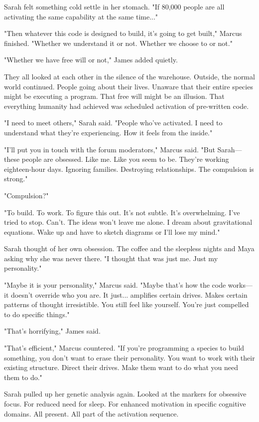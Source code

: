 Sarah felt something cold settle in her stomach. "If 80,000 people are all activating the same capability at the same time..."

"Then whatever this code is designed to build, it's going to get built," Marcus finished. "Whether we understand it or not. Whether we choose to or not."

"Whether we have free will or not," James added quietly.

They all looked at each other in the silence of the warehouse. Outside, the normal world continued. People going about their lives. Unaware that their entire species might be executing a program. That free will might be an illusion. That everything humanity had achieved was scheduled activation of pre-written code.

"I need to meet others," Sarah said. "People who've activated. I need to understand what they're experiencing. How it feels from the inside."

"I'll put you in touch with the forum moderators," Marcus said. "But Sarah—these people are obsessed. Like me. Like you seem to be. They're working eighteen-hour days. Ignoring families. Destroying relationships. The compulsion is strong."

"Compulsion?"

"To build. To work. To figure this out. It's not subtle. It's overwhelming. I've tried to stop. Can't. The ideas won't leave me alone. I dream about gravitational equations. Wake up and have to sketch diagrams or I'll lose my mind."

Sarah thought of her own obsession. The coffee and the sleepless nights and Maya asking why she was never there. "I thought that was just me. Just my personality."

"Maybe it is your personality," Marcus said. "Maybe that's how the code works—it doesn't override who you are. It just... amplifies certain drives. Makes certain patterns of thought irresistible. You still feel like yourself. You're just compelled to do specific things."

"That's horrifying," James said.

"That's efficient," Marcus countered. "If you're programming a species to build something, you don't want to erase their personality. You want to work with their existing structure. Direct their drives. Make them want to do what you need them to do."

Sarah pulled up her genetic analysis again. Looked at the markers for obsessive focus. For reduced need for sleep. For enhanced motivation in specific cognitive domains. All present. All part of the activation sequence.

